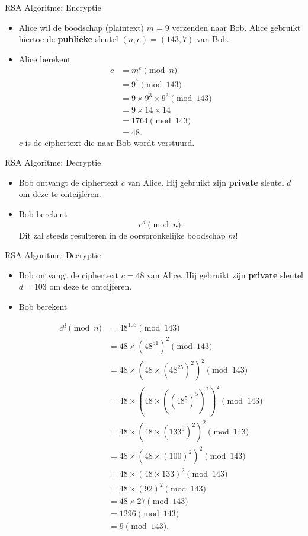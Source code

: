 \documentclass{beamer}
\begin{document}
\begin{frame}{RSA Algoritme: Encryptie}
\begin{itemize}
	\item Alice wil de boodschap (plaintext) $m = 9$ verzenden naar Bob. 
	Alice gebruikt hiertoe de \textbf{publieke} sleutel $(n, e) = (143, 7)$ van Bob.
	\item Alice berekent
	\begin{align*}
	c & =  m^e \pmod{n} \\
	  & = 9^7 \pmod{143} \\
	  & = 9 \times 9^3 \times 9^3 \pmod{143} \\
	  & = 9\times 14\times 14 \\
	  &  = 1764 \pmod{143} \\
	  & =   48.
	\end{align*}
	$c$ is de ciphertext die naar Bob wordt verstuurd.
\end{itemize}
\end{frame}

\begin{frame}{RSA Algoritme: Decryptie}
\begin{itemize}
	\item Bob ontvangt de ciphertext $c$ van Alice. Hij gebruikt zijn \textbf{private} sleutel $d$ om deze te ontcijferen.
	\item Bob berekent
	\[
	c^d \pmod{n}.
	\]
	Dit zal steeds resulteren in de oorspronkelijke boodschap $m$!
\end{itemize}
\end{frame}


\begin{frame}{RSA Algoritme: Decryptie}
\begin{itemize}
	\item Bob ontvangt de ciphertext $c = 48$ van Alice. Hij gebruikt zijn \textbf{private} sleutel $d = 103$ om deze te ontcijferen.
	\item Bob berekent
	\begin{small}
	\begin{align*}
	c^d \pmod{n} & = 48^{103} \pmod{143} \\
	             & = 48 \times (48^{51})^2 \pmod{143} \\
	             & = 48 \times (48 \times (48^{25})^2)^2 \pmod{143} \\
	             & = 48 \times (48 \times ((48^5)^5)^2)^2 \pmod{143} \\ 
	             & = 48 \times (48 \times (133^5)^2)^2 \pmod{143} \\
	             & = 48 \times (48 \times (100)^2)^2 \pmod{143} \\  	           
	             & = 48 \times (48 \times 133)^2 \pmod{143} \\  
	             & = 48 \times (92)^2 \pmod{143} \\ 
	             & = 48 \times 27 \pmod{143} \\ 
	             & = 1296 \pmod{143} \\ 
	             & = 9 \pmod{143}.
	\end{align*}
	\end{small}
\end{itemize}
\end{frame}
\end{document}
